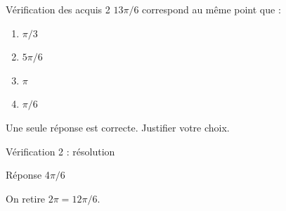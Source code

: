 \documentclass[aspectratio=169,12pt]{beamer}
\begin{document}
\renewcommand{\slidekind}{À VOUS DE JOUER}\begin{frame}[t]{Vérification des acquis 2}
$13\pi/6$ correspond au même point que :\begin{enumerate}
\item $\pi/3$
\item $5\pi/6$
\item $\pi$
\item $\pi/6$
\end{enumerate}\medskip Une seule réponse est correcte. Justifier votre choix.\end{frame}
\renewcommand{\slidekind}{COMPRENDRE LA RÉPONSE}\begin{frame}[t]{Vérification 2 : résolution}
\begin{block}{Réponse 4}$\pi/6$\end{block}\medskip On retire $2\pi=12\pi/6$.\end{frame}
\end{document}
